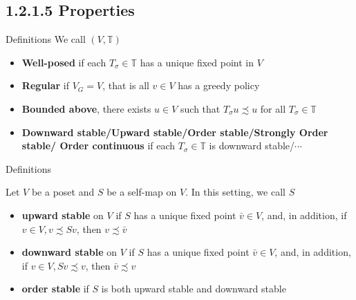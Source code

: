 \subsection{1.2.1.5 Properties}
\begin{frame}{Definitions}
We call $(V,\mathbb{T})$ 
\begin{itemize}
    \item \textbf{Well-posed} if each $T_\sigma\in\mathbb{T}$ has a unique fixed point in $V$
    \item \textbf{Regular} if $V_G=V$, that is all $v\in V$ has a greedy policy
    \item \textbf{Bounded above}, there exists $u\in V$ such that $T_\sigma u \precsim u$ for all $T_\sigma\in \mathbb{T}$
    \item \textbf{Downward stable/Upward stable/Order stable/Strongly Order stable/ Order continuous} if each $T_\sigma\in\mathbb{T}$ is downward stable/$\cdots$
\end{itemize}

\end{frame}
\begin{frame}{Definitions}
\begin{definition}
    Let $V$ be a poset and $S$ be a self-map on $V$. In this setting, we call $S$
    \begin{itemize}
        \item \textbf{upward stable} on $V$ if $S$ has a unique fixed point $\bar v\in V$, and, in addition, if $v\in V, v\precsim Sv$, then $v\precsim \bar v$
        \item \textbf{downward stable} on $V$ if $S$ has a unique fixed point $\bar v\in V$, and, in addition, if $v\in V, Sv\precsim v$, then $\bar v\precsim v$
        \item \textbf{order stable} if $S$ is both upward stable and downward stable
    \end{itemize}
\end{definition}
    
\end{frame}


